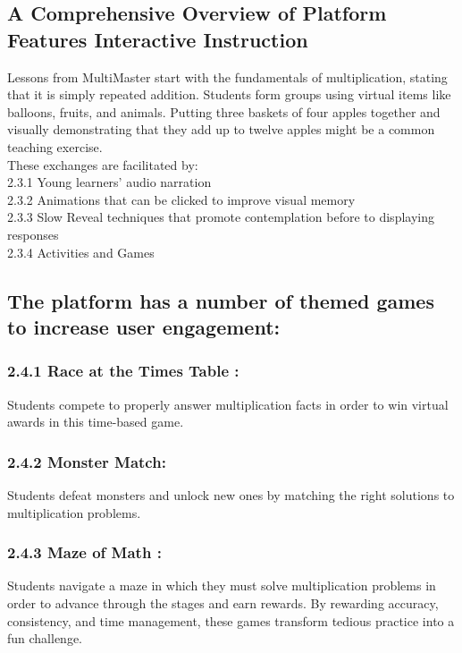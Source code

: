 \documentclass[BTech]{audiss}
\begin{document}
\subsection{A Comprehensive Overview of Platform Features Interactive Instruction}
Lessons from MultiMaster start with the fundamentals of multiplication, stating that it is simply repeated addition. Students form groups using virtual items like balloons, fruits, and animals. Putting three baskets of four apples together and visually demonstrating that they add up to twelve apples might be a common teaching exercise.\\
These exchanges are facilitated by:\\
2.3.1 Young learners' audio narration \\
2.3.2 Animations that can be clicked to improve visual memory \\
2.3.3 Slow Reveal techniques that promote contemplation before to displaying responses\\
2.3.4 Activities and Games\\


\subsection{The platform has a number of themed games to increase user engagement:}
\subsubsection{2.4.1 Race at the Times Table :}
Students compete to properly answer multiplication facts in order to win virtual awards in this time-based game.
\subsubsection{2.4.2 Monster Match:}
Students defeat monsters and unlock new ones by matching the right solutions to multiplication problems.

\subsubsection{2.4.3 Maze of Math :}
Students navigate a maze in which they must solve multiplication problems in order to advance through the stages and earn rewards. By rewarding accuracy, consistency, and time management, these games transform tedious practice into a fun challenge.
\end{document}
